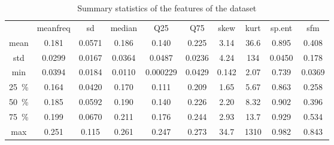 \begin{table}[htb]
	\caption{Summary statistics of the features of the dataset}
	 \begin{subtable}{\textwidth}
			\centering
			\begin{tabular}{@{} c c c c  c c c c c c @{}}\toprule
				& meanfreq & sd & median & Q25 & Q75 & skew & kurt & sp.ent & sfm \\
			mean & \num{0.181} &\num{0.0571} & \num{0.186} & \num{0.140} & \num{0.225} & \num{3.14} &\num{36.6} & \num{0.895} &	\num{0.408} \\
			std & \num{0.0299} & \num{0.0167} & \num{0.0364} & \num{0.0487} & \num{0.0236} & \num{4.24} & \num{134} & \num{0.0450} & \num{0.178} \\
			min & \num{0.0394} & \num{0.0184} & \num{0.0110} & \num{0.000229} & \num{0.0429} & \num{0.142} & \num{2.07} & \num{0.739} & \num{0.0369} \\
			\SI{25}{\percent} & \num{0.164} & \num{0.0420} & \num{0.170} & \num{0.111} & \num{0.209} & \num{1.65} & \num{5.67} & \num{0.863} & \num{0.258} \\
			\SI{50}{\percent} & \num{0.185} & \num{0.0592} & \num{0.190} & \num{0.140} & \num{0.226} & \num{2.20} & \num{8.32} & \num{0.902} & \num{0.396} \\
			\SI{75}{\percent} & \num{0.199} & \num{0.0670} & \num{0.211}  & \num{0.176} & \num{0.244} & \num{2.93} & \num{13.7} & \num{0.929} & \num{0.534} \\
			max & \num{0.251} & \num{0.115} & \num{0.261} & \num{0.247} &
			\num{0.273} & \num{34.7} & \num{1310} & \num{0.982} & \num{0.843} \\ \bottomrule
			\end{tabular}
		\end{subtable}\hfill\null%


\end{table}
